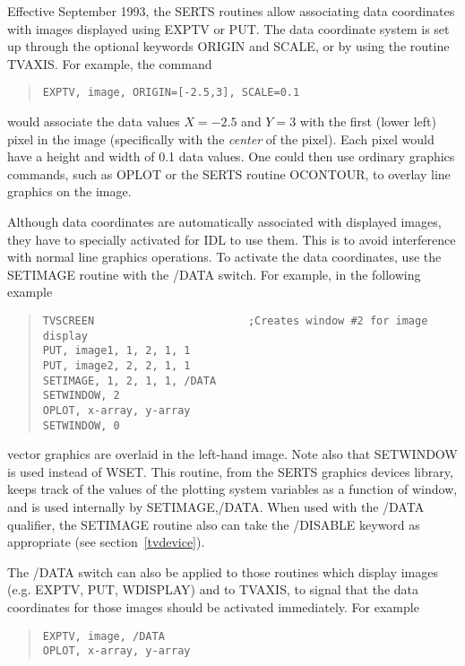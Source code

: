 Effective September 1993, the SERTS routines allow associating data coordinates
with images displayed using EXPTV or PUT.  The data coordinate system is set up
through the optional keywords ORIGIN and SCALE, or by using the routine TVAXIS.
For example, the command
\begin{quote}
\begin{verbatim}
EXPTV, image, ORIGIN=[-2.5,3], SCALE=0.1
\end{verbatim}
\end{quote}
would associate the data values \mbox{$X = -2.5$} and \mbox{$Y = 3$} with the
first (lower left) pixel in the image (specifically with the {\em center} of
the pixel).  Each pixel would have a height and width of 0.1 data values.  One
could then use ordinary graphics commands, such as OPLOT or the SERTS routine
OCONTOUR, to overlay line graphics on the image.

Although data coordinates are automatically associated with displayed images,
they have to specially activated for IDL to use them.  This is to avoid
interference with normal line graphics operations.  To activate the data
coordinates, use the SETIMAGE routine with the /DATA switch.  For example, in
the following example
\begin{quote}
\begin{verbatim}
TVSCREEN                        ;Creates window #2 for image display
PUT, image1, 1, 2, 1, 1
PUT, image2, 2, 2, 1, 1
SETIMAGE, 1, 2, 1, 1, /DATA
SETWINDOW, 2
OPLOT, x-array, y-array
SETWINDOW, 0
\end{verbatim}
\end{quote}
vector graphics are overlaid in the left-hand image.  Note also that SETWINDOW
is used instead of WSET.  This routine, from the SERTS graphics devices
library, keeps track of the values of the plotting system variables as a
function of window, and is used internally by SETIMAGE,/DATA.  When used with
the /DATA qualifier, the SETIMAGE routine also can take the /DISABLE keyword as
appropriate (see section~\ref{tvdevice}).

The /DATA switch can also be applied to those routines which display images
(e.g. EXPTV, PUT, WDISPLAY) and to TVAXIS, to signal that the data coordinates
for those images should be activated immediately.  For example
\begin{quote}
\begin{verbatim}
EXPTV, image, /DATA
OPLOT, x-array, y-array
\end{verbatim}
\end{quote}

